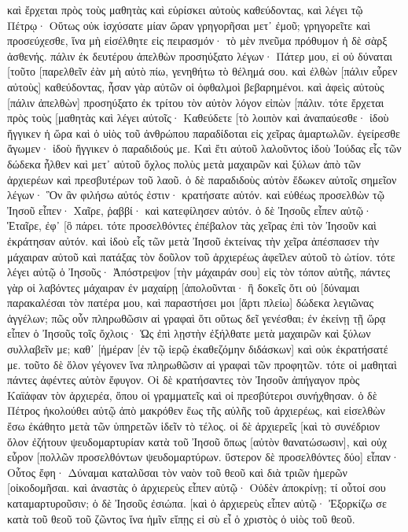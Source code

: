 καὶ ἔρχεται πρὸς τοὺς μαθητὰς καὶ εὑρίσκει αὐτοὺς καθεύδοντας, καὶ λέγει τῷ Πέτρῳ· Οὕτως οὐκ ἰσχύσατε μίαν ὥραν γρηγορῆσαι μετ᾽ ἐμοῦ; 
γρηγορεῖτε καὶ προσεύχεσθε, ἵνα μὴ εἰσέλθητε εἰς πειρασμόν· τὸ μὲν πνεῦμα πρόθυμον ἡ δὲ σὰρξ ἀσθενής. 
πάλιν ἐκ δευτέρου ἀπελθὼν προσηύξατο λέγων· Πάτερ μου, εἰ οὐ δύναται [τοῦτο [παρελθεῖν ἐὰν μὴ αὐτὸ πίω, γενηθήτω τὸ θέλημά σου. 
καὶ ἐλθὼν [πάλιν εὗρεν αὐτοὺς] καθεύδοντας, ἦσαν γὰρ αὐτῶν οἱ ὀφθαλμοὶ βεβαρημένοι. 
καὶ ἀφεὶς αὐτοὺς [πάλιν ἀπελθὼν] προσηύξατο ἐκ τρίτου τὸν αὐτὸν λόγον εἰπὼν [πάλιν. 
τότε ἔρχεται πρὸς τοὺς [μαθητὰς καὶ λέγει αὐτοῖς· Καθεύδετε [τὸ λοιπὸν καὶ ἀναπαύεσθε· ἰδοὺ ἤγγικεν ἡ ὥρα καὶ ὁ υἱὸς τοῦ ἀνθρώπου παραδίδοται εἰς χεῖρας ἁμαρτωλῶν. 
ἐγείρεσθε ἄγωμεν· ἰδοὺ ἤγγικεν ὁ παραδιδούς με. 
Καὶ ἔτι αὐτοῦ λαλοῦντος ἰδοὺ Ἰούδας εἷς τῶν δώδεκα ἦλθεν καὶ μετ᾽ αὐτοῦ ὄχλος πολὺς μετὰ μαχαιρῶν καὶ ξύλων ἀπὸ τῶν ἀρχιερέων καὶ πρεσβυτέρων τοῦ λαοῦ. 
ὁ δὲ παραδιδοὺς αὐτὸν ἔδωκεν αὐτοῖς σημεῖον λέγων· Ὃν ἂν φιλήσω αὐτός ἐστιν· κρατήσατε αὐτόν. 
καὶ εὐθέως προσελθὼν τῷ Ἰησοῦ εἶπεν· Χαῖρε, ῥαββί· καὶ κατεφίλησεν αὐτόν. 
ὁ δὲ Ἰησοῦς εἶπεν αὐτῷ· Ἑταῖρε, ἐφ᾽ [ὃ πάρει. τότε προσελθόντες ἐπέβαλον τὰς χεῖρας ἐπὶ τὸν Ἰησοῦν καὶ ἐκράτησαν αὐτόν. 
καὶ ἰδοὺ εἷς τῶν μετὰ Ἰησοῦ ἐκτείνας τὴν χεῖρα ἀπέσπασεν τὴν μάχαιραν αὐτοῦ καὶ πατάξας τὸν δοῦλον τοῦ ἀρχιερέως ἀφεῖλεν αὐτοῦ τὸ ὠτίον. 
τότε λέγει αὐτῷ ὁ Ἰησοῦς· Ἀπόστρεψον [τὴν μάχαιράν σου] εἰς τὸν τόπον αὐτῆς, πάντες γὰρ οἱ λαβόντες μάχαιραν ἐν μαχαίρῃ [ἀπολοῦνται· 
ἢ δοκεῖς ὅτι οὐ [δύναμαι παρακαλέσαι τὸν πατέρα μου, καὶ παραστήσει μοι [ἄρτι πλείω] δώδεκα λεγιῶνας ἀγγέλων; 
πῶς οὖν πληρωθῶσιν αἱ γραφαὶ ὅτι οὕτως δεῖ γενέσθαι; 
ἐν ἐκείνῃ τῇ ὥρᾳ εἶπεν ὁ Ἰησοῦς τοῖς ὄχλοις· Ὡς ἐπὶ λῃστὴν ἐξήλθατε μετὰ μαχαιρῶν καὶ ξύλων συλλαβεῖν με; καθ᾽ [ἡμέραν [ἐν τῷ ἱερῷ ἐκαθεζόμην διδάσκων] καὶ οὐκ ἐκρατήσατέ με. 
τοῦτο δὲ ὅλον γέγονεν ἵνα πληρωθῶσιν αἱ γραφαὶ τῶν προφητῶν. τότε οἱ μαθηταὶ πάντες ἀφέντες αὐτὸν ἔφυγον. 
Οἱ δὲ κρατήσαντες τὸν Ἰησοῦν ἀπήγαγον πρὸς Καϊάφαν τὸν ἀρχιερέα, ὅπου οἱ γραμματεῖς καὶ οἱ πρεσβύτεροι συνήχθησαν. 
ὁ δὲ Πέτρος ἠκολούθει αὐτῷ ἀπὸ μακρόθεν ἕως τῆς αὐλῆς τοῦ ἀρχιερέως, καὶ εἰσελθὼν ἔσω ἐκάθητο μετὰ τῶν ὑπηρετῶν ἰδεῖν τὸ τέλος. 
οἱ δὲ ἀρχιερεῖς [καὶ τὸ συνέδριον ὅλον ἐζήτουν ψευδομαρτυρίαν κατὰ τοῦ Ἰησοῦ ὅπως [αὐτὸν θανατώσωσιν], 
καὶ οὐχ εὗρον [πολλῶν προσελθόντων ψευδομαρτύρων. ὕστερον δὲ προσελθόντες δύο] 
εἶπαν· Οὗτος ἔφη· Δύναμαι καταλῦσαι τὸν ναὸν τοῦ θεοῦ καὶ διὰ τριῶν ἡμερῶν [οἰκοδομῆσαι. 
καὶ ἀναστὰς ὁ ἀρχιερεὺς εἶπεν αὐτῷ· Οὐδὲν ἀποκρίνῃ; τί οὗτοί σου καταμαρτυροῦσιν; 
ὁ δὲ Ἰησοῦς ἐσιώπα. [καὶ ὁ ἀρχιερεὺς εἶπεν αὐτῷ· Ἐξορκίζω σε κατὰ τοῦ θεοῦ τοῦ ζῶντος ἵνα ἡμῖν εἴπῃς εἰ σὺ εἶ ὁ χριστὸς ὁ υἱὸς τοῦ θεοῦ. 
